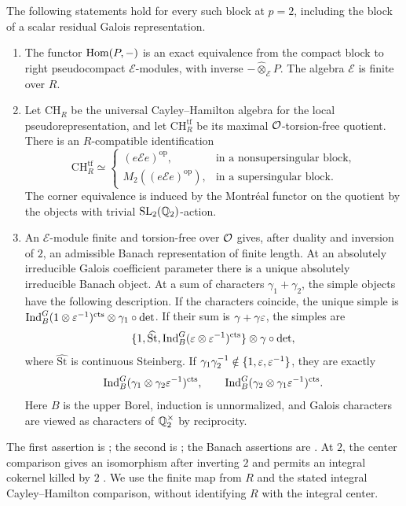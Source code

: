 \begin{theorem}[Pa\v{s}k\=unas--Tung]\label{input:local-blocks}
The following statements hold for every such block at \(p=2\),
including the block of a scalar residual Galois representation.
\begin{enumerate}
\item The functor \(\operatorname{Hom}(P,-)\) is an exact equivalence from the compact
block to right pseudocompact \(\mathcal E\)-modules, with inverse
\(-\widehat\otimes_{\mathcal E}P\). The algebra \(\mathcal E\) is finite
over \(R\).
\item Let \(\mathrm{CH}_R\) be the universal Cayley--Hamilton algebra
for the local pseudorepresentation, and let
\(\mathrm{CH}_R^{\mathrm{tf}}\) be its maximal
\(\mathcal O\)-torsion-free quotient. There is an \(R\)-compatible
identification
\[
 \mathrm{CH}_R^{\mathrm{tf}}\simeq
 \begin{cases}
  (e\mathcal E e)^{\mathrm{op}},&\text{in a nonsupersingular block},\\
  M_2((e\mathcal E e)^{\mathrm{op}}),&\text{in a supersingular block}.
 \end{cases}
\]
The corner equivalence is induced by the Montr\'eal functor on the
quotient by the objects with trivial \(\operatorname{SL}_2(\mathbb Q_2)\)-action.
\item An \(\mathcal E\)-module finite and torsion-free over \(\mathcal O\) gives,
after duality and inversion of \(2\), an admissible Banach representation
of finite length. At an absolutely irreducible Galois coefficient
parameter there is a unique absolutely irreducible Banach object. At a
sum of characters \(\gamma_1+\gamma_2\), the simple objects have the
following description. If the characters coincide, the unique simple is
\(\operatorname{Ind}_B^G(1\otimes\varepsilon^{-1})^{\mathrm{cts}}\otimes\gamma_1\circ\det\).
If their sum is \(\gamma+\gamma\varepsilon\), the simples are
\[
 \{1,\widehat{\mathrm{St}},
       \operatorname{Ind}_B^G(\varepsilon\otimes\varepsilon^{-1})^{\mathrm{cts}}\}
       \otimes\gamma\circ\det,
\]
where \(\widehat{\mathrm{St}}\) is continuous Steinberg. If
\(\gamma_1\gamma_2^{-1}\notin\{1,\varepsilon,\varepsilon^{-1}\}\), they are exactly
\[
 \operatorname{Ind}_B^G(\gamma_1\otimes\gamma_2\varepsilon^{-1})^{\mathrm{cts}},
 \qquad
 \operatorname{Ind}_B^G(\gamma_2\otimes\gamma_1\varepsilon^{-1})^{\mathrm{cts}}.
\]
Here \(B\) is the upper Borel, induction is unnormalized, and Galois
characters are viewed as characters of \(\mathbb Q_2^\times\) by reciprocity.
\end{enumerate}
\end{theorem}

The first assertion is \cite[Section~4.1 and Theorems~1.2--1.3]
{PaskunasTung2021}; the second is
\cite[Propositions~4.10 and~4.18, Theorem~6.13]{PaskunasTung2021};
the Banach assertions are \cite[Section~4.5, Section~6.2,
Equation~(20), Proposition~6.9, Corollary~6.10, and
Proposition~6.11]{PaskunasTung2021}.
At \(2\), the center comparison gives an isomorphism after inverting
\(2\) and permits an integral cokernel killed by \(2\)
\cite[Theorem~1.4]{PaskunasTung2021}. We use the finite map from \(R\)
and the stated integral Cayley--Hamilton comparison, without identifying
\(R\) with the integral center.

